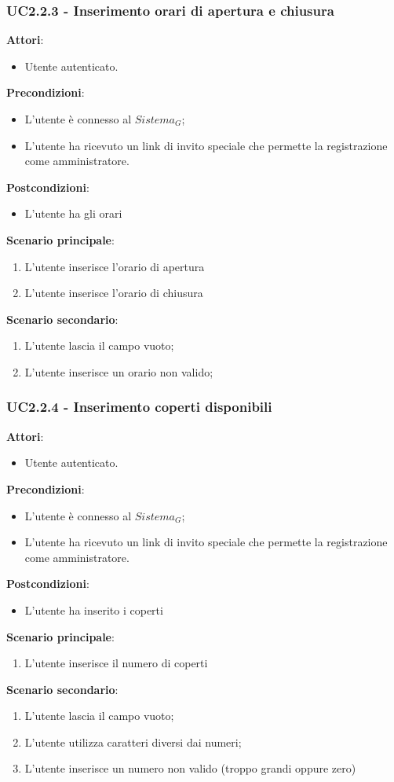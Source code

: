 \subsubsection{UC2.2.3 - Inserimento orari di apertura e chiusura}
\textbf{Attori}:
\begin{itemize}
    \item Utente autenticato.
\end{itemize}
\textbf{Precondizioni}:
\begin{itemize}
    \item L'utente è connesso al $\textit{Sistema}_G$;
    \item L'utente ha ricevuto un link di invito speciale che permette la registrazione come amministratore.
\end{itemize}
\textbf{Postcondizioni}:
\begin{itemize}
    \item L'utente ha gli orari
\end{itemize}
\textbf{Scenario principale}:
\begin{enumerate}
    \item L'utente inserisce l'orario di apertura
    \item L'utente inserisce l'orario di chiusura
\end{enumerate}
\textbf{Scenario secondario}:
\begin{enumerate}
    \item L'utente lascia il campo vuoto;
    \item L'utente inserisce un orario non valido;
\end{enumerate}
\subsubsection{UC2.2.4 - Inserimento coperti disponibili}
\textbf{Attori}:
\begin{itemize}
    \item Utente autenticato.
\end{itemize}
\textbf{Precondizioni}:
\begin{itemize}
    \item L'utente è connesso al $\textit{Sistema}_G$;
    \item L'utente ha ricevuto un link di invito speciale che permette la registrazione come amministratore.
\end{itemize}
\textbf{Postcondizioni}:
\begin{itemize}
    \item L'utente ha inserito i coperti
\end{itemize}
\textbf{Scenario principale}:
\begin{enumerate}
    \item L'utente inserisce il numero di coperti
\end{enumerate}
\textbf{Scenario secondario}:
\begin{enumerate}
    \item L'utente lascia il campo vuoto;
    \item L'utente utilizza caratteri diversi dai numeri;
    \item L'utente inserisce un numero non valido (troppo grandi oppure zero)
\end{enumerate}
